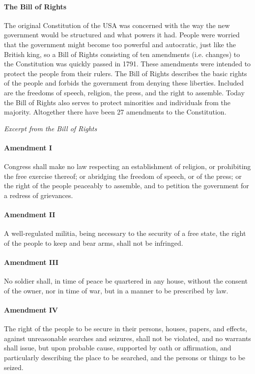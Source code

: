 \documentclass[10pt]{article}
\begin{document}
\paragraph{The Bill of Rights}
\label{par:usa/const/bill}
The original Constitution of the USA was concerned with the way the new government would be
structured and what powers it had. People were worried that the government might become too
powerful and autocratic, just like the British king, so a Bill of Rights consisting of ten amendments
(i.e. changes) to the Constitution was quickly passed in 1791. These amendments were intended to
protect the people from their rulers. The Bill of Rights describes the basic rights of the people and
forbids the government from denying these liberties. Included are the freedoms of speech, religion,
the press, and the right to assemble. Today the Bill of Rights also serves to protect minorities and
individuals from the majority. Altogether there have been 27 amendments to the Constitution.
\begin{example}
\textit{Excerpt from the Bill of Rights}
\paragraph{Amendment I}
\label{par:usa/const/bill/I}
Congress shall make no law respecting an establishment of religion, or prohibiting the free exercise thereof; or abridging
the freedom of speech, or of the press; or the right of the people peaceably to assemble, and to petition the government
for a redress of grievances.

\paragraph{Amendment II}
\label{par:usa/const/bill/II}
A well-regulated militia, being necessary to the security of a free state, the right of the people to keep and bear arms, shall
not be infringed.

\paragraph{Amendment III}
\label{par:usa/const/bill/III}
No soldier shall, in time of peace be quartered in any house, without the consent of the owner, nor in time of war, but in a
manner to be prescribed by law.

\paragraph{Amendment IV}
\label{par:usa/const/bill/IV}
The right of the people to be secure in their persons, houses, papers, and effects, against unreasonable searches and
seizures, shall not be violated, and no warrants shall issue, but upon probable cause, supported by oath or affirmation, and
particularly describing the place to be searched, and the persons or things to be seized.
\end{example}
\end{document}
